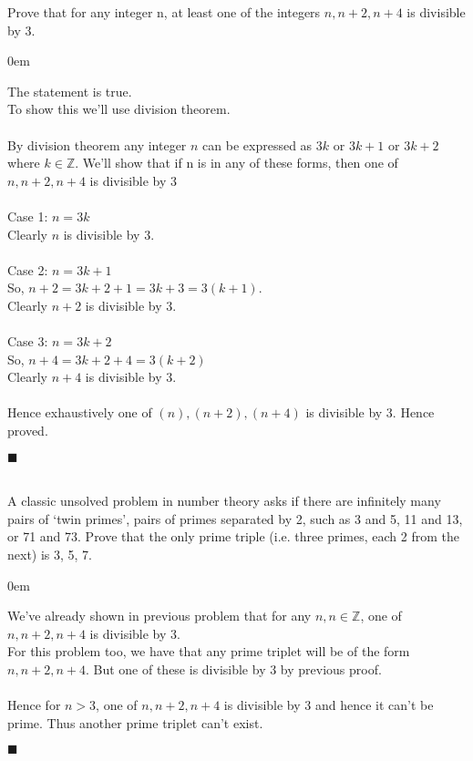 \documentclass[12pt]{article}
\newcommand{\Z}{\mathbb{Z}}
\renewcommand{\qed}{\hfill$\blacksquare$}
\renewenvironment{proof}{\begin{addmargin}[1em]{0em}\begin{newproof}}{\end{newproof}\end{addmargin}\qed}
\newenvironment{problem}[2][Problem]{\begin{trivlist}
\item[\hskip \labelsep {\bfseries #1}\hskip \labelsep {\bfseries #2.}]}{\end{trivlist}}
\begin{document}
 
 \begin{problem}{5}  Prove that for any integer n, at least one of the integers $n, n + 2, n + 4$ is divisible by 3.
\end{problem}

\begin{proof}
The statement is true.\\
To show this we'll use division theorem. \\ \\
By division theorem any integer $n$ can be expressed as $3k$ or $3k+1$ or $3k+2$ where $k \in \Z$. We'll show that if n is in any of these forms, then one of $n, n+2, n+4$ is divisible by 3 \\ \\
Case 1: $n=3k$\\
Clearly $n$ is divisible by 3.\\ \\
Case 2: $n=3k+1$ \\
So, $n+2 = 3k+2+1 = 3k+3 = 3(k+1)$.\\
Clearly $n+2$ is divisible by 3.\\ \\
Case 3: $n=3k+2$ \\
So, $n+4 = 3k+2+4 = 3(k+2)$ \\
Clearly $n+4$ is divisible by 3.\\ \\
Hence exhaustively one of $(n), (n+2), (n+4)$ is divisible by 3. Hence proved.
\end{proof}
 \\
 \\
 
 \begin{problem}{6} A classic unsolved problem in number theory asks if there are infinitely many pairs of ‘twin primes’, pairs of primes separated by 2, such as 3 and 5, 11 and 13, or 71 and 73. Prove that the only prime triple (i.e. three primes, each 2 from the next) is 3, 5, 7.
\end{problem}

\begin{proof}
We've already shown in previous problem that for any $n, n \in \Z$, one of $n, n+2, n+4$ is divisible by 3.\\
For this problem too, we have that any prime triplet will be of the form $n, n+2, n+4$. But one of these is divisible by 3 by previous proof. \\ \\
Hence for $n > 3$, one of $n, n+2, n+4$ is divisible by 3 and hence it can't be prime. Thus another prime triplet can't exist.
\end{proof}
 \\
 \\
 
\end{document}
